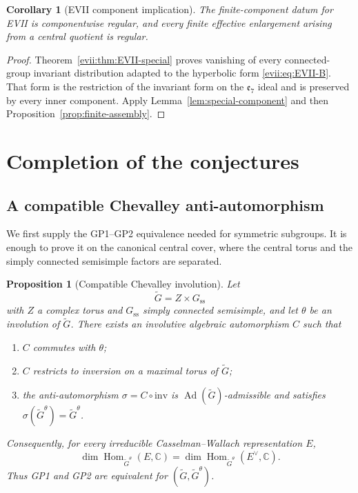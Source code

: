 \documentclass[11pt,reqno]{amsart}
\numberwithin{equation}{section}
\newtheorem{proposition}[theorem]{Proposition}
\newtheorem{corollary}[theorem]{Corollary}
\theoremstyle{definition}
\theoremstyle{remark}
\newcommand{\C}{\mathbb C}
\newcommand{\Hom}{\operatorname{Hom}}
\newcommand{\Ad}{\operatorname{Ad}}
\begin{document}
\begin{corollary}[EVII component implication]\label{cor:EVII-component}
The finite-component datum for EVII is componentwise regular, and every finite
effective enlargement arising from a central quotient is regular.
\end{corollary}

\begin{proof}
Theorem~\ref{evii:thm:EVII-special} proves vanishing of every connected-group
invariant distribution adapted to the hyperbolic form
\eqref{evii:eq:EVII-B}.  That form is the restriction of the invariant form on
the $\mathfrak e_7$ ideal and is preserved by every inner component.  Apply
Lemma~\ref{lem:special-component} and then
Proposition~\ref{prop:finite-assembly}.
\end{proof}

\section{Completion of the conjectures}\label{sec:completion}

\subsection{A compatible Chevalley anti-automorphism}

We first supply the GP1--GP2 equivalence needed for symmetric subgroups.  It is
enough to prove it on the canonical central cover, where the central torus and
the simply connected semisimple factors are separated.

\begin{proposition}[Compatible Chevalley involution]
\label{prop:compatible-chevalley}
Let
\[
 \widetilde G=Z\times G_{\mathrm{ss}}
\]
with $Z$ a complex torus and $G_{\mathrm{ss}}$ simply connected semisimple, and
let $\theta$ be an involution of $\widetilde G$.  There exists an involutive
algebraic automorphism $C$ such that
\begin{enumerate}[label=\textup{(\roman*)}]
\item $C$ commutes with $\theta$;
\item $C$ restricts to inversion on a maximal torus of $\widetilde G$;
\item the anti-automorphism $\sigma=C\circ\mathrm{inv}$ is
      $\Ad(\widetilde G)$-admissible and satisfies
      $\sigma(\widetilde G^\theta)=\widetilde G^\theta$.
\end{enumerate}
Consequently, for every irreducible Casselman--Wallach representation $E$,
\[
 \dim\Hom_{\widetilde G^\theta}(E,\C)
 =\dim\Hom_{\widetilde G^\theta}(E^\vee,\C).
\]
Thus GP1 and GP2 are equivalent for $(\widetilde G,\widetilde G^\theta)$.
\end{proposition}
\end{document}
